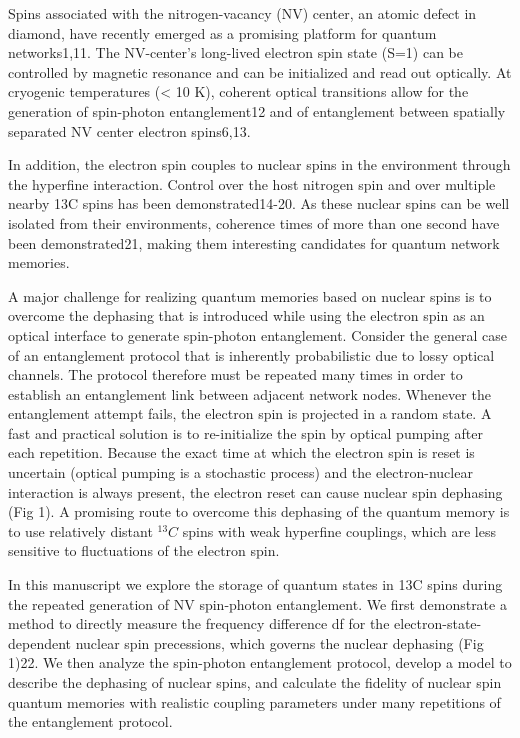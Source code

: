 Spins associated with the nitrogen-vacancy (NV) center, an atomic defect in diamond, have recently emerged as a promising platform for quantum networks1,11. The NV-center’s long-lived electron spin state (S=1) can be controlled by magnetic resonance and can be initialized and read out optically. At cryogenic temperatures (< 10 K), coherent optical transitions allow for the generation of spin-photon entanglement12 and of entanglement between spatially separated NV center electron spins6,13. 

In addition, the electron spin couples to nuclear spins in the environment through the hyperfine interaction. Control over the host nitrogen spin and over multiple nearby 13C spins has been demonstrated14-20. As these nuclear spins can be well isolated from their environments, coherence times of more than one second have been demonstrated21, making them interesting candidates for quantum network memories. 

A major challenge for realizing quantum memories based on nuclear spins is to overcome the dephasing that is introduced while using the electron spin as an optical interface to generate spin-photon entanglement. Consider the general case of an entanglement protocol that is inherently probabilistic due to lossy optical channels. The protocol therefore must be repeated many times in order to establish an entanglement link between adjacent network nodes. Whenever the entanglement attempt fails, the electron spin is projected in a random state. A fast and practical solution is to re-initialize the spin by optical pumping after each repetition. Because the exact time at which the electron spin is reset is uncertain (optical pumping is a stochastic process) and the electron-nuclear interaction is always present, the electron reset can cause nuclear spin dephasing (Fig 1). A promising route to overcome this dephasing of the quantum memory is to use relatively distant $^{13}C$ spins with weak hyperfine couplings, which are less sensitive to fluctuations of the electron spin.  

In this manuscript we explore the storage of quantum states in 13C spins during the repeated generation of NV spin-photon entanglement. We first demonstrate a method to directly measure the frequency difference df for the electron-state-dependent nuclear spin precessions, which governs the nuclear dephasing (Fig 1)22. We then analyze the spin-photon entanglement protocol, develop a model to describe the dephasing of nuclear spins, and calculate the fidelity of nuclear spin quantum memories with realistic coupling parameters under many repetitions of the entanglement protocol. 


